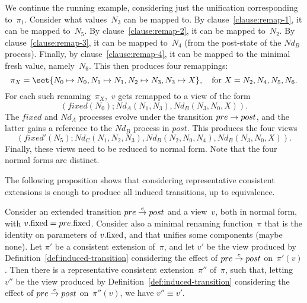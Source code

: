 
\begin{example}
We continue the running example, considering just the unification
corresponding to~$\pi_1$.  Consider what values~$N_3$ can be mapped to.  By
clause~\ref{clause:remap-1}, it can be mapped to~$N_5$.  By
clause~\ref{clause:remap-2}, it can be mapped to~$N_2$.  By
clause~\ref{clause:remap-3}, it can be mapped to~$N_4$ (from the post-state of
the $Nd_B$ process).  Finally, by clause~\ref{clause:remap-4}, it can be
mapped to the minimal fresh value, namely~$N_6$.
%
This then produces four remappings:
\[
\pi_X = \set{N_0 \mapsto N_0, N_1 \mapsto N_1, N_2 \mapsto N_3, N_3 \mapsto X},
\quad \mbox{for $X = N_2, N_4, N_5, N_6$}.
\]
For each such renaming~$\pi_X$,\, $v$ gets remapped to a view of the form
\[
(fixed(N_0); Nd_A(N_1, N_3), Nd_B(N_3, N_0, X)).
\]
The $fixed$ and $Nd_A$ processes evolve under the transition \( pre
\stackrel{}\rightarrow post \), and the latter gains a reference to the $Nd_B$ process in
$post$.  This produces the four views
\[
(fixed'(N_5); Nd_C(N_1, N_2, N_3), Nd_B(N_2, N_0, N_4), Nd_B(N_3, N_0, X)).
\]
Finally, these views need to be reduced to normal form.  Note that the four
normal forms are distinct.
\end{example}


The following proposition shows that considering representative consistent
extensions is enough to produce all induced transitions, up to equivalence. 
%
\begin{prop}
\label{prop:unifying-renaming}
Consider an extended transition $pre \stackrel{e}\rightarrow post$ and a view~$v$, both in
normal form, with $v.\mathrm{fixed} = pre.\mathrm{fixed}$.  Consider also a minimal renaming
function~$\pi$ that is the identity on parameters of $v.\mathrm{fixed}$, and that
unifies some components (maybe none).
%
Let $\pi'$ be a consistent extension of~$\pi$, and
let $v'$ be the view produced by Definition~\ref{def:induced-transition}
considering the effect of $pre \stackrel{e}\rightarrow post$ on~$\pi'(v)$.  
%
Then there is a representative consistent extension~$\pi''$ of~$\pi$, such
that, letting $v''$ be the view produced by
Definition~\ref{def:induced-transition} considering the effect of $pre
\stackrel{e}\rightarrow post$ on~$\pi''(v)$, we have $v'' \equiv v'$.
\end{prop}


